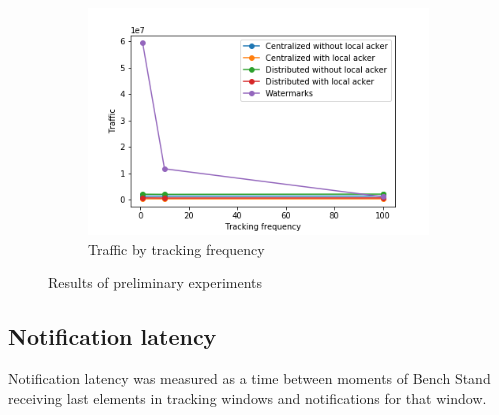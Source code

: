 \begin{figure}[t!]
\begin{subfigure}[b]{0.32\textwidth}
            \includegraphics[width=0.99\textwidth]{pics/traffic_by_tracking_frequency.png}
            \caption{Traffic by tracking frequency}
	\end{subfigure}
    \caption{Results of preliminary experiments}
\end{figure}

\subsection{Notification latency}

Notification latency was measured as a time between moments of Bench Stand receiving last elements in tracking windows and notifications for that window.

